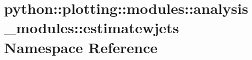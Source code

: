 \hypertarget{namespacepython_1_1plotting_1_1modules_1_1analysis__modules_1_1estimatewjets}{
\section{python::plotting::modules::analysis\_\-modules::estimatewjets Namespace Reference}
\label{namespacepython_1_1plotting_1_1modules_1_1analysis__modules_1_1estimatewjets}
}
